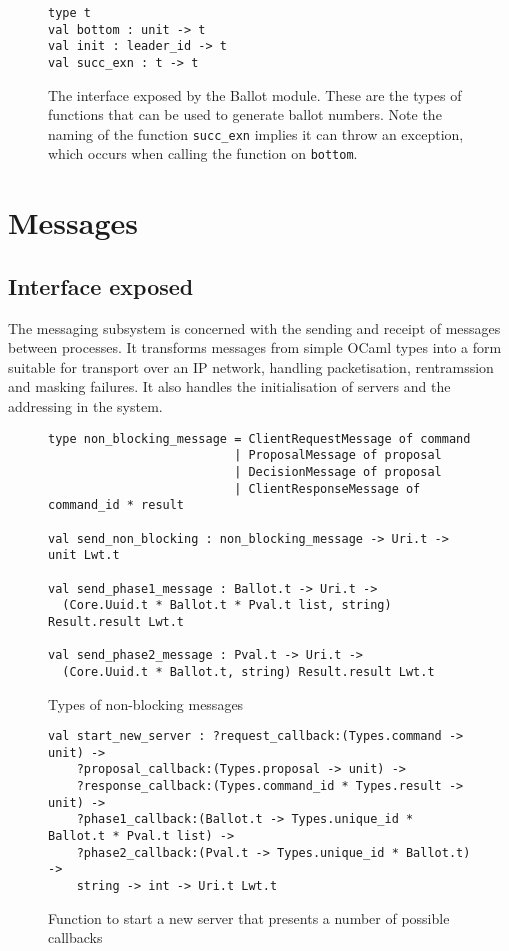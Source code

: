 \begin{figure}
  \begin{lstlisting}
type t
val bottom : unit -> t
val init : leader_id -> t
val succ_exn : t -> t
  \end{lstlisting}
    \caption{The interface exposed by the Ballot module. These are the types of functions that can be used to generate ballot numbers. Note the naming of the function \texttt{succ\_exn} implies it can throw an exception, which occurs when calling the function on \texttt{bottom}.}
    \label{fig:ballot-interface}
  \centering
\end{figure}

\section{Messages}
\label{section:messages}
\subsection{Interface exposed}

The messaging subsystem is concerned with the sending and receipt of messages between processes. It transforms messages from simple OCaml types into a form suitable for transport over an IP network, handling packetisation, rentramssion and masking failures. It also handles the initialisation of servers and the addressing in the system. \\

\begin{figure}[t]
  \begin{lstlisting}
type non_blocking_message = ClientRequestMessage of command
                          | ProposalMessage of proposal
                          | DecisionMessage of proposal
                          | ClientResponseMessage of command_id * result
                          
val send_non_blocking : non_blocking_message -> Uri.t -> unit Lwt.t

val send_phase1_message : Ballot.t -> Uri.t -> 
  (Core.Uuid.t * Ballot.t * Pval.t list, string) Result.result Lwt.t
    
val send_phase2_message : Pval.t -> Uri.t -> 
  (Core.Uuid.t * Ballot.t, string) Result.result Lwt.t
  \end{lstlisting}
  \centering
  \caption{Types of non-blocking messages}
  \label{message-types}
\end{figure}

\begin{figure}[t]
  \begin{lstlisting}
val start_new_server : ?request_callback:(Types.command -> unit) ->
    ?proposal_callback:(Types.proposal -> unit) ->
    ?response_callback:(Types.command_id * Types.result -> unit) ->
    ?phase1_callback:(Ballot.t -> Types.unique_id * Ballot.t * Pval.t list) ->
    ?phase2_callback:(Pval.t -> Types.unique_id * Ballot.t) ->
    string -> int -> Uri.t Lwt.t  
  \end{lstlisting}
  \centering
  \caption{Function to start a new server that presents a number of possible callbacks}
  \label{fig:message-server}
\end{figure}


